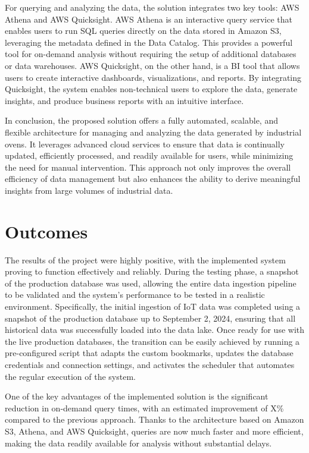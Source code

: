 For querying and analyzing the data, the solution integrates two key tools: \ac{AWS} Athena and \ac{AWS} Quicksight. \ac{AWS} Athena is an interactive query service that enables users to run \ac{SQL} queries directly on the data stored in Amazon S3, leveraging the metadata defined in the Data Catalog. This provides a powerful tool for on-demand analysis without requiring the setup of additional databases or data warehouses. \ac{AWS} Quicksight, on the other hand, is a \ac{BI} tool that allows users to create interactive dashboards, visualizations, and reports. By integrating Quicksight, the system enables non-technical users to explore the data, generate insights, and produce business reports with an intuitive interface.

In conclusion, the proposed solution offers a fully automated, scalable, and flexible architecture for managing and analyzing the data generated by industrial ovens. It leverages advanced cloud services to ensure that data is continually updated, efficiently processed, and readily available for users, while minimizing the need for manual intervention. This approach not only improves the overall efficiency of data management but also enhances the ability to derive meaningful insights from large volumes of industrial data.
\section{Outcomes}
The results of the project were highly positive, with the implemented system proving to function effectively and reliably. During the testing phase, a snapshot of the production database was used, allowing the entire data ingestion pipeline to be validated and the system's performance to be tested in a realistic environment. Specifically, the initial ingestion of IoT data was completed using a snapshot of the production database up to September 2, 2024, ensuring that all historical data was successfully loaded into the data lake. Once ready for use with the live production databases, the transition can be easily achieved by running a pre-configured script that adapts the custom bookmarks, updates the database credentials and connection settings, and activates the scheduler that automates the regular execution of the system.

One of the key advantages of the implemented solution is the significant reduction in on-demand query times, with an estimated improvement of X\% compared to the previous approach. Thanks to the architecture based on Amazon S3, Athena, and \ac{AWS} Quicksight, queries are now much faster and more efficient, making the data readily available for analysis without substantial delays.

